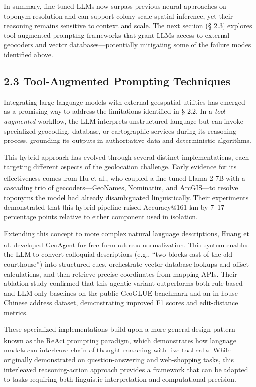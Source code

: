 \documentclass[
  10pt]{article}
\begin{document}
In summary, fine-tuned LLMs now surpass previous neural approaches on
toponym resolution and can support colony-scale spatial inference, yet
their reasoning remains sensitive to context and scale. The next section
(§ 2.3) explores tool-augmented prompting frameworks that grant LLMs
access to external geocoders and vector databases---potentially
mitigating some of the failure modes identified above.

\subsection{2.3 Tool-Augmented Prompting
Techniques}\label{tool-augmented-prompting-techniques}

Integrating large language models with external geospatial utilities has
emerged as a promising way to address the limitations identified in §
2.2. In a \emph{tool-augmented} workflow, the LLM interprets
unstructured language but can invoke specialized geocoding, database, or
cartographic services during its reasoning process, grounding its
outputs in authoritative data and deterministic algorithms.

This hybrid approach has evolved through several distinct
implementations, each targeting different aspects of the geolocation
challenge. Early evidence for its effectiveness comes from Hu et
al.\textsuperscript{}, who coupled
a fine-tuned Llama 2-7B with a cascading trio of geocoders---GeoNames,
Nominatim, and ArcGIS---to resolve toponyms the model had already
disambiguated linguistically. Their experiments demonstrated that this
hybrid pipeline raised Accuracy@161 km by 7--17 percentage points
relative to either component used in isolation.

Extending this concept to more complex natural language descriptions,
Huang et al.\textsuperscript{}
developed GeoAgent for free-form address normalization. This system
enables the LLM to convert colloquial descriptions (e.g., ``two blocks
east of the old courthouse'') into structured cues, orchestrate
vector-database lookups and offset calculations, and then retrieve
precise coordinates from mapping APIs. Their ablation study confirmed
that this agentic variant outperforms both rule-based and LLM-only
baselines on the public GeoGLUE benchmark and an in-house Chinese
address dataset, demonstrating improved F1 scores and edit-distance
metrics.

These specialized implementations build upon a more general design
pattern known as the ReAct prompting
paradigm\textsuperscript{}, which
demonstrates how language models can interleave chain-of-thought
reasoning with live tool calls. While originally demonstrated on
question-answering and web-shopping tasks, this interleaved
reasoning-action approach provides a framework that can be adapted to
tasks requiring both linguistic interpretation and computational
precision.
\end{document}
